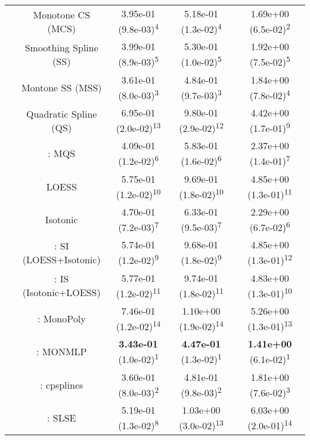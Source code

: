 \begin{tabular}{ccccc}
&Monotone CS (MCS)& 3.95e-01 (9.8e-03)\textsuperscript{4}& 5.18e-01 (1.3e-02)\textsuperscript{4}& 1.69e+00 (6.5e-02)\textsuperscript{2}\tabularnewline
&Smoothing Spline (SS)& 3.99e-01 (8.9e-03)\textsuperscript{5}& 5.30e-01 (1.0e-02)\textsuperscript{5}& 1.92e+00 (7.5e-02)\textsuperscript{5}\tabularnewline
&Montone SS (MSS)& 3.61e-01 (8.0e-03)\textsuperscript{3}& 4.84e-01 (9.7e-03)\textsuperscript{3}& 1.84e+00 (7.8e-02)\textsuperscript{4}\tabularnewline
&Quadratic Spline (QS)& 6.95e-01 (2.0e-02)\textsuperscript{13}& 9.80e-01 (2.9e-02)\textsuperscript{12}& 4.42e+00 (1.7e-01)\textsuperscript{9}\tabularnewline
&\textcite{heMonotoneBsplineSmoothing1998}: MQS& 4.09e-01 (1.2e-02)\textsuperscript{6}& 5.83e-01 (1.6e-02)\textsuperscript{6}& 2.37e+00 (1.4e-01)\textsuperscript{7}\tabularnewline
&LOESS& 5.75e-01 (1.2e-02)\textsuperscript{10}& 9.69e-01 (1.8e-02)\textsuperscript{10}& 4.85e+00 (1.3e-01)\textsuperscript{11}\tabularnewline
&Isotonic& 4.70e-01 (7.2e-03)\textsuperscript{7}& 6.33e-01 (9.5e-03)\textsuperscript{7}& 2.29e+00 (6.7e-02)\textsuperscript{6}\tabularnewline
&\textcite{mammenEstimatingSmoothMonotone1991}: SI (LOESS+Isotonic)& 5.74e-01 (1.2e-02)\textsuperscript{9}& 9.68e-01 (1.8e-02)\textsuperscript{9}& 4.85e+00 (1.3e-01)\textsuperscript{12}\tabularnewline
&\textcite{mammenEstimatingSmoothMonotone1991}: IS (Isotonic+LOESS)& 5.77e-01 (1.2e-02)\textsuperscript{11}& 9.74e-01 (1.8e-02)\textsuperscript{11}& 4.83e+00 (1.3e-01)\textsuperscript{10}\tabularnewline
&\textcite{murrayFastFlexibleMethods2016a}: MonoPoly& 7.46e-01 (1.2e-02)\textsuperscript{14}& 1.10e+00 (1.9e-02)\textsuperscript{14}& 5.26e+00 (1.3e-01)\textsuperscript{13}\tabularnewline
&\textcite{cannonMonmlpMultilayerPerceptron2017}: MONMLP& \textbf{3.43e-01} (1.0e-02)\textsuperscript{1}& \textbf{4.47e-01} (1.3e-02)\textsuperscript{1}& \textbf{1.41e+00} (6.1e-02)\textsuperscript{1}\tabularnewline
&\textcite{navarro-garciaConstrainedSmoothingOutofrange2023}: cpsplines& 3.60e-01 (8.0e-03)\textsuperscript{2}& 4.81e-01 (9.8e-03)\textsuperscript{2}& 1.81e+00 (7.6e-02)\textsuperscript{3}\tabularnewline
&\textcite{groeneboomConfidenceIntervalsMonotone2023}: SLSE& 5.19e-01 (1.3e-02)\textsuperscript{8}& 1.03e+00 (3.0e-02)\textsuperscript{13}& 6.03e+00 (2.0e-01)\textsuperscript{14}\tabularnewline
\bottomrule
\end{tabular}
